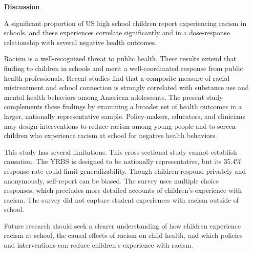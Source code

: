 \documentclass[12pt]{article}
\begin{document}
\vspace{6pt}

\noindent\textbf{Discussion}

A significant proportion of US high school children report experiencing racism in schools,
and these experiences correlate significantly and in a dose-response relationship with
several negative health outcomes.

Racism is a well-recognized threat to public health.\cite{williams2013racism,paradies2015racism} These results extend that
finding to children in schools\cite{priest2013racism} and merit a well-coordinated response from public
health professionals. Recent studies find that a composite measure of racial mistreatment and school connection is strongly correlated with substance use and mental health behaviors among American adolescents. \cite{azagba2025school,azagba2026belonging} The present study complements these findings by examining a broader
set of health outcomes in a larger, nationally representative sample. Policy-makers, educators, and clinicians
may design interventions to reduce racism among young people and to screen children who
experience racism at school for negative health behaviors.\cite{trent2019impact}

This study has several limitations. This cross-sectional study cannot establish causation.
The YRBS is designed to be nationally representative, but its 35.4\% response rate could
limit generalizability. Though children respond privately and anonymously, self-report
can be biased. The survey uses multiple choice responses, which precludes more detailed
accounts of children's experience with racism. The survey did not capture student
experiences with racism outside of school.

Future research should seek a clearer understanding of how children experience racism
at school, the causal effects of racism on child health, and which policies and
interventions can reduce children's experience with racism.

\clearpage


\end{document}
